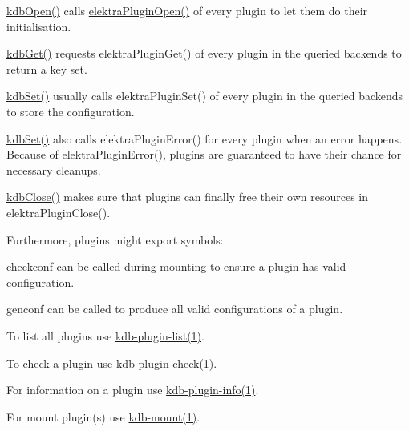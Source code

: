 \begin{DoxyItemize}
\item {\ttfamily \mbox{\hyperlink{group__kdb_ga6808defe5870f328dd17910aacbdc6ca}{kdb\+Open()}}} calls {\ttfamily \mbox{\hyperlink{elektra_2plugin_8c_a32a70a7876542c51d153164ac5108a57}{elektra\+Plugin\+Open()}}} of every plugin to let them do their initialisation.
\item {\ttfamily \mbox{\hyperlink{group__kdb_ga28e385fd9cb7ccfe0b2f1ed2f62453a1}{kdb\+Get()}}} requests {\ttfamily elektra\+Plugin\+Get()} of every plugin in the queried backends to return a key set.
\item {\ttfamily \mbox{\hyperlink{group__kdb_ga11436b058408f83d303ca5e996832bcf}{kdb\+Set()}}} usually calls {\ttfamily elektra\+Plugin\+Set()} of every plugin in the queried backends to store the configuration.
\item {\ttfamily \mbox{\hyperlink{group__kdb_ga11436b058408f83d303ca5e996832bcf}{kdb\+Set()}}} also calls {\ttfamily elektra\+Plugin\+Error()} for every plugin when an error happens. Because of {\ttfamily elektra\+Plugin\+Error()}, plugins are guaranteed to have their chance for necessary cleanups.
\item {\ttfamily \mbox{\hyperlink{group__kdb_gadb54dc9fda17ee07deb9444df745c96f}{kdb\+Close()}}} makes sure that plugins can finally free their own resources in {\ttfamily elektra\+Plugin\+Close()}.
\end{DoxyItemize}

Furthermore, plugins might export symbols\+:


\begin{DoxyItemize}
\item {\ttfamily checkconf} can be called during mounting to ensure a plugin has valid configuration.
\item {\ttfamily genconf} can be called to produce all valid configurations of a plugin.
\end{DoxyItemize}


\begin{DoxyItemize}
\item To list all plugins use \mbox{\hyperlink{doc_help_kdb-plugin-list_md}{kdb-\/plugin-\/list(1)}}.
\item To check a plugin use \mbox{\hyperlink{doc_help_kdb-plugin-check_md}{kdb-\/plugin-\/check(1)}}.
\item For information on a plugin use \mbox{\hyperlink{doc_help_kdb-plugin-info_md}{kdb-\/plugin-\/info(1)}}.
\item For mount plugin(s) use \mbox{\hyperlink{doc_help_kdb-mount_md}{kdb-\/mount(1)}}.
\end{DoxyItemize}

